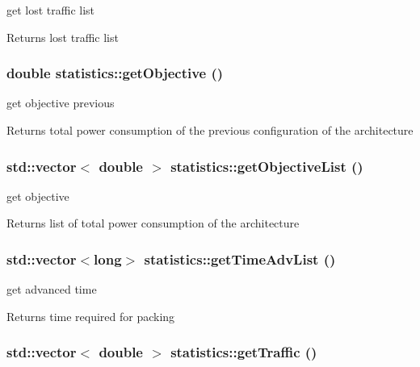 get lost traffic list 

\begin{DoxyReturn}{Returns}
lost traffic list 
\end{DoxyReturn}
\hypertarget{classstatistics_a8a09566df54f2ac183e0a40f452546a6}{
\subsubsection[{getObjective}]{\setlength{\rightskip}{0pt plus 5cm}double statistics::getObjective ()}}
\label{classstatistics_a8a09566df54f2ac183e0a40f452546a6}


get objective previous 

\begin{DoxyReturn}{Returns}
total power consumption of the previous configuration of the architecture 
\end{DoxyReturn}
\hypertarget{classstatistics_a47b6c911143330c41faa573bc534aee1}{
\subsubsection[{getObjectiveList}]{\setlength{\rightskip}{0pt plus 5cm}std::vector$<$ double $>$ statistics::getObjectiveList ()}}
\label{classstatistics_a47b6c911143330c41faa573bc534aee1}


get objective 

\begin{DoxyReturn}{Returns}
list of total power consumption of the architecture 
\end{DoxyReturn}
\hypertarget{classstatistics_a857adb219cf897c105a9e0aceca4188a}{
\subsubsection[{getTimeAdvList}]{\setlength{\rightskip}{0pt plus 5cm}std::vector$<$long$>$ statistics::getTimeAdvList ()}}
\label{classstatistics_a857adb219cf897c105a9e0aceca4188a}


get advanced time 

\begin{DoxyReturn}{Returns}
time required for packing 
\end{DoxyReturn}
\hypertarget{classstatistics_af512ba48d195d791b927bc49e2c40188}{
\subsubsection[{getTraffic}]{\setlength{\rightskip}{0pt plus 5cm}std::vector$<$ double $>$ statistics::getTraffic ()}}
\label{classstatistics_af512ba48d195d791b927bc49e2c40188}


